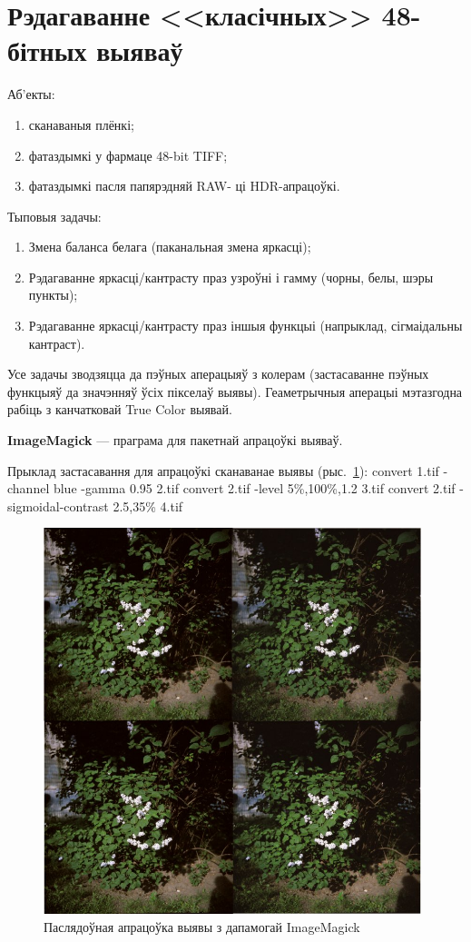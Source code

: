\documentclass[10pt, a5paper]{article}
\begin{document}
\section*{Рэдагаванне <<класічных>> 48-бітных выяваў}

Аб'екты:
\begin{enumerate}
\item сканаваныя плёнкі;
\item фатаздымкі у фармаце 48-bit TIFF;
\item фатаздымкі пасля папярэдняй RAW- ці HDR-апрацоўкі.
\end{enumerate}
Тыповыя задачы:
\begin{enumerate}
\item Змена баланса белага (паканальная змена яркасці);
\item Рэдагаванне яркасці/кантрасту праз узроўні і гамму (чорны, белы, шэры пункты);
\item Рэдагаванне яркасці/кантрасту праз іншыя функцыі (напрыклад, сігмаідальны кантраст).
\end{enumerate}
Усе задачы зводзяцца да пэўных аперацыяў з колерам (застасаванне пэўных функцыяў да значэнняў ўсіх пікселаў выявы). Геаметрычныя аперацыі мэтазгодна рабіць з канчатковай True Color выявай.

\textbf{ImageMagick} --- праграма для пакетнай апрацоўкі выяваў.

Прыклад застасавання для апрацоўкі сканаванае выявы (рыс.~\ref{fig:IM}):
convert 1.tif -channel blue -gamma 0.95 2.tif
convert 2.tif -level 5\%,100\%,1.2 3.tif
convert 2.tif -sigmoidal-contrast 2.5,35\% 4.tif

\begin{figure}[htpb]
 \includegraphics[width=110mm]{LAS_LVEE_2012_48bit.jpg}
 \caption{Паслядоўная апрацоўка выявы з дапамогай ImageMagick}
 \label{fig:IM}
\end{figure}
\end{document}
